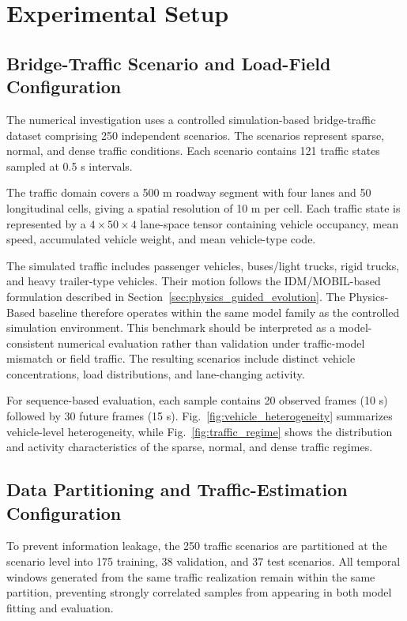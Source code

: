 \documentclass[journal]{IEEEtran}
\begin{document}
\section{Experimental Setup}
\subsection{Bridge-Traffic Scenario and Load-Field Configuration}

The numerical investigation uses a controlled simulation-based bridge-traffic dataset comprising 250 independent scenarios. The scenarios represent sparse, normal, and dense traffic conditions. Each scenario contains 121 traffic states sampled at 0.5 s intervals.

The traffic domain covers a 500 m roadway segment with four lanes and 50 longitudinal cells, giving a spatial resolution of 10 m per cell. Each traffic state is represented by a $4\times50\times4$ lane-space tensor containing vehicle occupancy, mean speed, accumulated vehicle weight, and mean vehicle-type code.

The simulated traffic includes passenger vehicles, buses/light trucks, rigid trucks, and heavy trailer-type vehicles. Their motion follows the IDM/MOBIL-based formulation described in Section~\ref{sec:physics_guided_evolution}. The Physics-Based baseline therefore operates within the same model family as the controlled simulation environment. This benchmark should be interpreted as a model-consistent numerical evaluation rather than validation under traffic-model mismatch or field traffic. The resulting scenarios include distinct vehicle concentrations, load distributions, and lane-changing activity.

For sequence-based evaluation, each sample contains 20 observed frames (10 s) followed by 30 future frames (15 s). Fig.~\ref{fig:vehicle_heterogeneity} summarizes vehicle-level heterogeneity, while Fig.~\ref{fig:traffic_regime} shows the distribution and activity characteristics of the sparse, normal, and dense traffic regimes.

\subsection{Data Partitioning and Traffic-Estimation Configuration}

To prevent information leakage, the 250 traffic scenarios are partitioned at the scenario level into 175 training, 38 validation, and 37 test scenarios. All temporal windows generated from the same traffic realization remain within the same partition, preventing strongly correlated samples from appearing in both model fitting and evaluation.
\end{document}
